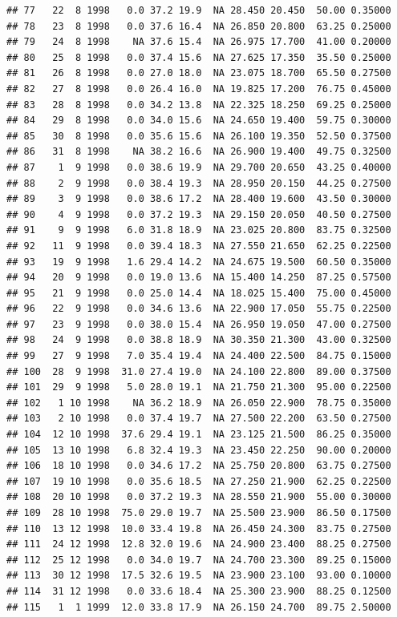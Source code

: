 \documentclass[
]{book}
\begin{document}
\begin{verbatim}
## 77   22  8 1998   0.0 37.2 19.9  NA 28.450 20.450  50.00 0.35000
## 78   23  8 1998   0.0 37.6 16.4  NA 26.850 20.800  63.25 0.25000
## 79   24  8 1998    NA 37.6 15.4  NA 26.975 17.700  41.00 0.20000
## 80   25  8 1998   0.0 37.4 15.6  NA 27.625 17.350  35.50 0.25000
## 81   26  8 1998   0.0 27.0 18.0  NA 23.075 18.700  65.50 0.27500
## 82   27  8 1998   0.0 26.4 16.0  NA 19.825 17.200  76.75 0.45000
## 83   28  8 1998   0.0 34.2 13.8  NA 22.325 18.250  69.25 0.25000
## 84   29  8 1998   0.0 34.0 15.6  NA 24.650 19.400  59.75 0.30000
## 85   30  8 1998   0.0 35.6 15.6  NA 26.100 19.350  52.50 0.37500
## 86   31  8 1998    NA 38.2 16.6  NA 26.900 19.400  49.75 0.32500
## 87    1  9 1998   0.0 38.6 19.9  NA 29.700 20.650  43.25 0.40000
## 88    2  9 1998   0.0 38.4 19.3  NA 28.950 20.150  44.25 0.27500
## 89    3  9 1998   0.0 38.6 17.2  NA 28.400 19.600  43.50 0.30000
## 90    4  9 1998   0.0 37.2 19.3  NA 29.150 20.050  40.50 0.27500
## 91    9  9 1998   6.0 31.8 18.9  NA 23.025 20.800  83.75 0.32500
## 92   11  9 1998   0.0 39.4 18.3  NA 27.550 21.650  62.25 0.22500
## 93   19  9 1998   1.6 29.4 14.2  NA 24.675 19.500  60.50 0.35000
## 94   20  9 1998   0.0 19.0 13.6  NA 15.400 14.250  87.25 0.57500
## 95   21  9 1998   0.0 25.0 14.4  NA 18.025 15.400  75.00 0.45000
## 96   22  9 1998   0.0 34.6 13.6  NA 22.900 17.050  55.75 0.22500
## 97   23  9 1998   0.0 38.0 15.4  NA 26.950 19.050  47.00 0.27500
## 98   24  9 1998   0.0 38.8 18.9  NA 30.350 21.300  43.00 0.32500
## 99   27  9 1998   7.0 35.4 19.4  NA 24.400 22.500  84.75 0.15000
## 100  28  9 1998  31.0 27.4 19.0  NA 24.100 22.800  89.00 0.37500
## 101  29  9 1998   5.0 28.0 19.1  NA 21.750 21.300  95.00 0.22500
## 102   1 10 1998    NA 36.2 18.9  NA 26.050 22.900  78.75 0.35000
## 103   2 10 1998   0.0 37.4 19.7  NA 27.500 22.200  63.50 0.27500
## 104  12 10 1998  37.6 29.4 19.1  NA 23.125 21.500  86.25 0.35000
## 105  13 10 1998   6.8 32.4 19.3  NA 23.450 22.250  90.00 0.20000
## 106  18 10 1998   0.0 34.6 17.2  NA 25.750 20.800  63.75 0.27500
## 107  19 10 1998   0.0 35.6 18.5  NA 27.250 21.900  62.25 0.22500
## 108  20 10 1998   0.0 37.2 19.3  NA 28.550 21.900  55.00 0.30000
## 109  28 10 1998  75.0 29.0 19.7  NA 25.500 23.900  86.50 0.17500
## 110  13 12 1998  10.0 33.4 19.8  NA 26.450 24.300  83.75 0.27500
## 111  24 12 1998  12.8 32.0 19.6  NA 24.900 23.400  88.25 0.27500
## 112  25 12 1998   0.0 34.0 19.7  NA 24.700 23.300  89.25 0.15000
## 113  30 12 1998  17.5 32.6 19.5  NA 23.900 23.100  93.00 0.10000
## 114  31 12 1998   0.0 33.6 18.4  NA 25.300 23.900  88.25 0.12500
## 115   1  1 1999  12.0 33.8 17.9  NA 26.150 24.700  89.75 2.50000

\end{verbatim}
\end{document}
